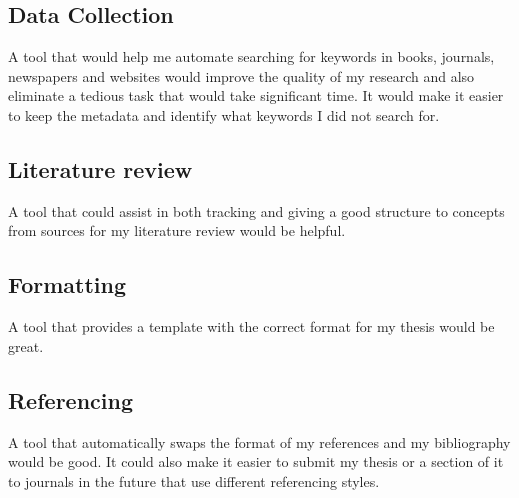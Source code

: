 \documentclass{article}
\begin{document}
\subsection*{Data Collection}

A tool that would help me automate searching for keywords in books, journals, newspapers and websites would improve the quality of my research and also eliminate a tedious task that would take significant time. It would make it easier to keep the metadata and identify what keywords I did not search for.

\subsection*{Literature review}
A tool that could assist in both tracking and giving a good structure to concepts from sources for my literature review would be helpful.

\subsection*{Formatting}
A tool that provides a template with the correct format for my thesis would be great.

\subsection*{Referencing}

A tool that automatically swaps the format of my references and my bibliography would be good. It could also make it easier to submit my thesis or a section of it to journals in the future that use different referencing styles.
\end{document}
